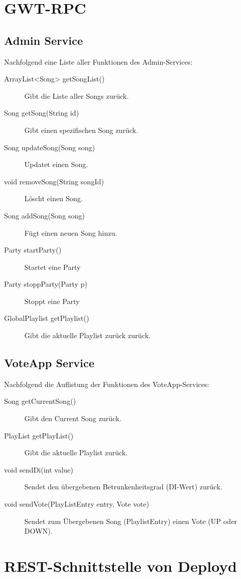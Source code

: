 \section{GWT-RPC}

\subsection{Admin Service}
Nachfolgend eine Liste aller Funktionen des Admin-Services:
\begin{description}
	\item[ArrayList<Song> getSongList()] Gibt die Liste aller Songs zurück.
	\item[Song getSong(String id)] Gibt einen spezifischen Song zurück.
	\item[Song updateSong(Song song)] Updatet einen Song.
	\item[void removeSong(String songId)]	Löscht einen Song.
	\item[Song addSong(Song song)] Fügt einen neuen Song hinzu.
	\item[Party startParty()]	Startet eine Party
	\item[Party stoppParty(Party p)] Stoppt eine Party
	\item[GlobalPlaylist getPlaylist()] Gibt die aktuelle Playlist zurück zurück.
\end{description}


\subsection{VoteApp Service}
Nachfolgend die Auflistung der Funktionen des VoteApp-Services:
\begin{description}
	\item[Song getCurrentSong()] Gibt den Current Song zurück.
	\item[PlayList getPlayList()]	Gibt die aktuelle Playlist zurück.
	\item[void sendDi(int value)] Sendet den übergebenen Betrunkenheitsgrad (DI-Wert) zurück.
	\item[void sendVote(PlayListEntry entry, Vote vote)] Sendet zum Übergebenen Song (PlaylistEntry) einen Vote (UP oder DOWN).
\end{description}

\section{REST-Schnittstelle von Deployd}


